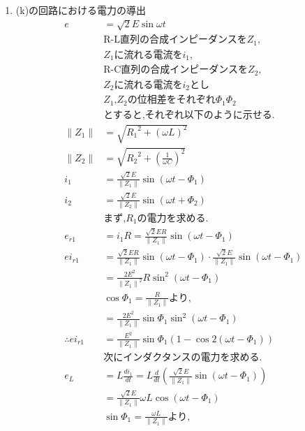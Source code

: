 \documentclass[twocolumn]{article}
\begin{document}
\begin{enumerate}
  \item (k)の回路における電力の導出
        \begin{align*}
          e &= \sqrt{2}E\sin\omega t\\
          &\text{R-L直列の合成インピーダンスを}Z_1\text{,}\\
          &Z_1\text{に流れる電流を}i_1\text{,}\\
          &\text{R-C直列の合成インピーダンスを}Z_2\text{,}\\
          &Z_2\text{に流れる電流を}i_2\text{とし}\\
          &Z_1\text{,}Z_2\text{の位相差をそれぞれ}\Phi_1 \Phi_2\\
          &\text{とすると,それぞれ以下のように示せる.}\\
          \|Z_1\| &= \sqrt{{R_1}^2 + {\left(\omega L\right)}^2}\\
          \|Z_2\| &= \sqrt{{R_2}^2 + {\left(\frac{1}{\omega C}\right)}^2}\\
          i_1 &= \frac{\sqrt{2}E}{\|Z_1\|} \sin \left(\omega t - \Phi_1\right)\\
          i_2 &= \frac{\sqrt{2}E}{\|Z_2\|} \sin \left(\omega t + \Phi_2\right)\\
          &\text{まず,}R_1\text{の電力を求める.}\\
          e_{r1} &= i_1R = \frac{\sqrt{2}ER}{\|Z_1\|}\sin\left(\omega t - \Phi_1\right)\\
          ei_{r1} &= \frac{\sqrt{2}ER}{\|Z_1\|}\sin\left(\omega t - \Phi_1\right) \cdot \frac{\sqrt{2}E}{\|Z_1\|} \sin \left(\omega t - \Phi_1\right)\\
               &= \frac{2E^2}{{\|Z_1\|}^2}R\sin^2\left(\omega t - \Phi_1\right)\\
          &\cos \Phi_1 = \frac{R}{\|Z_1\|}\text{より,}\\
               &= \frac{2E^2}{\|Z_1\|}\sin\Phi_1\sin^2\left(\omega t - \Phi_1\right)\\
\therefore ei_{r1} &= \frac{E^2}{\|Z_1\|}\sin\Phi_1 \left(1 - \cos 2 \left(\omega t - \Phi_1\right)\right)\\
          &\text{次にインダクタンスの電力を求める.}\\
          e_L &= L \frac{di_1}{dt} = L \frac{d}{dt} \left(\frac{\sqrt{2}E}{\|Z_1\|} \sin \left(\omega t - \Phi_1\right)\right)\\
              &= \frac{\sqrt{2}E}{\|Z_1\|} \omega L \cos \left( \omega t - \Phi_1 \right)\\
          &\sin \Phi_1 = \frac{\omega L}{\|Z_1\|}\text{より,}\\

\end{align*}
\end{enumerate}
\end{document}
